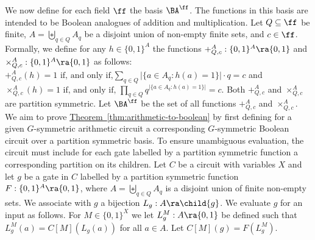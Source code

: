 \documentclass[11pt]{article}
\newcommand{\expref}[2]{\texorpdfstring{\hyperref[#2]{#1~\ref{#2}}}{#1~\ref{#2}}}
\begin{document}
We now define for each field $\ff$ the basis $\BA^{\ff}$. The functions in this
basis are intended to be Boolean analogues of addition and multiplication. Let
$Q \subseteq \ff$ be finite, $A = \biguplus_{q \in Q}A_q$ be a disjoint union of
non-empty finite sets, and $c \in \ff$.  Formally, we define for any $h \in \{0,1\}^{A}$ the functions $+^A_{Q, c}: \{0,
1\}^A \ra \{0, 1\}$ and $\times^A_{Q, c}: \{0, 1\}^A \ra \{0, 1\}$ as follows: $ +^{A}_{Q, c}(h) = 1
\text{ if, and only if,} \sum_{q \in Q} \vert \{a \in A_q : h(a) = 1\} \vert
\cdot q = c $ and $ \times^{A}_{Q, c}(h) = 1 \text{ if, and only if, } \prod_{q
  \in Q} q^{\vert \{a \in A_q : h(a) = 1\} \vert} = c$. Both $+^A_{Q, c}$ and
$\times^A_{Q, c}$ are partition symmetric. Let $\BA^{\ff}$ be the set of all
functions $+^A_{Q, c}$ and $\times^A_{Q, c}$.
We aim to prove \expref{Theorem}{thm:arithmetic-to-boolean} by first defining for a
given $G$-symmetric arithmetic circuit a corresponding $G$-symmetric Boolean
circuit over a partition symmetric basis. To ensure unambiguous evaluation, the
circuit must include for each gate labelled by a partition symmetric function a
corresponding partition on its children. Let $C$ be a circuit with variables $X$
and let $g$ be a gate in $C$ labelled by a partition symmetric function $F :
\{0, 1\}^A \ra \{0, 1\}$, where $A = \biguplus_{q \in Q}A_q$ is a disjoint union
of finite non-empty sets. We associate with $g$ a bijection $L_g : A \ra
\child{g}$. We evaluate $g$ for an input as follows. For $M \in \{0, 1\}^{X}$ we
let $L^M_g : A \ra \{0, 1\}$ be defined such that $L^M_g(a) = C[M](L_g(a))$ for
all $a \in A$. Let $C[M](g) = F(L^M_g)$.
\end{document}
